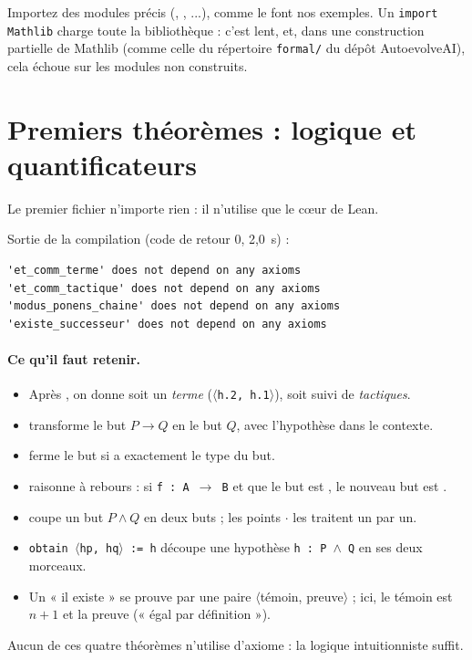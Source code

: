 \begin{warnbox}
Importez des modules précis (, , ...), comme le font nos
exemples. Un \texttt{import Mathlib} charge toute la bibliothèque : c'est lent, et, dans une construction partielle de
Mathlib (comme celle du répertoire \texttt{formal/} du dépôt AutoevolveAI), cela échoue sur les modules non construits.
\end{warnbox}

\section{Premiers théorèmes : logique et quantificateurs}\label{appC:sec:logique}

Le premier fichier n'importe rien : il n'utilise que le cœur de Lean.


\noindent Sortie de la compilation (code de retour $0$, 2,0~s) :
\begin{lstlisting}[style=appC,language={}]
'et_comm_terme' does not depend on any axioms
'et_comm_tactique' does not depend on any axioms
'modus_ponens_chaine' does not depend on any axioms
'existe_successeur' does not depend on any axioms
\end{lstlisting}

\paragraph{Ce qu'il faut retenir.}
\begin{itemize}
\item Après \lean{:=}, on donne soit un \emph{terme} (\texttt{$\langle$h.2, h.1$\rangle$}), soit  suivi de \emph{tactiques}.
\item {} transforme le but $P\to Q$ en le but $Q$, avec l'hypothèse  dans le contexte.
\item {} ferme le but si  a exactement le type du but.
\item {} raisonne à rebours : si \texttt{f : A $\to$ B} et que le but est , le nouveau but est .
\item {} coupe un but $P\wedge Q$ en deux buts ; les points \texttt{$\cdot$} les traitent un par un.
\item \texttt{obtain $\langle$hp, hq$\rangle$ := h} découpe une hypothèse \texttt{h : P $\wedge$ Q} en ses deux morceaux.
\item Un « il existe » se prouve par une paire $\langle$témoin, preuve$\rangle$ ; ici, le témoin est $n+1$ et la preuve
 (« égal par définition »).
\end{itemize}
Aucun de ces quatre théorèmes n'utilise d'axiome : la logique intuitionniste suffit.


